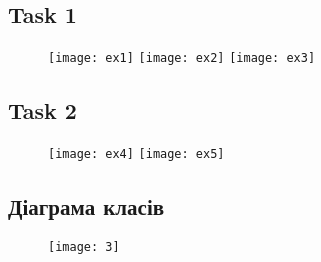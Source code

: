 \subsection{Task 1}
\begin{figure}[H]
\texttt{[image: ex1]}
\texttt{[image: ex2]}
\texttt{[image: ex3]}
\centering
\end{figure}

\subsection{Task 2}
\begin{figure}[H]
\texttt{[image: ex4]}
\texttt{[image: ex5]}
\centering
\end{figure}

\subsection{Діаграма класів}
\begin{figure}[H]
\texttt{[image: 3]}
\centering
\end{figure}
